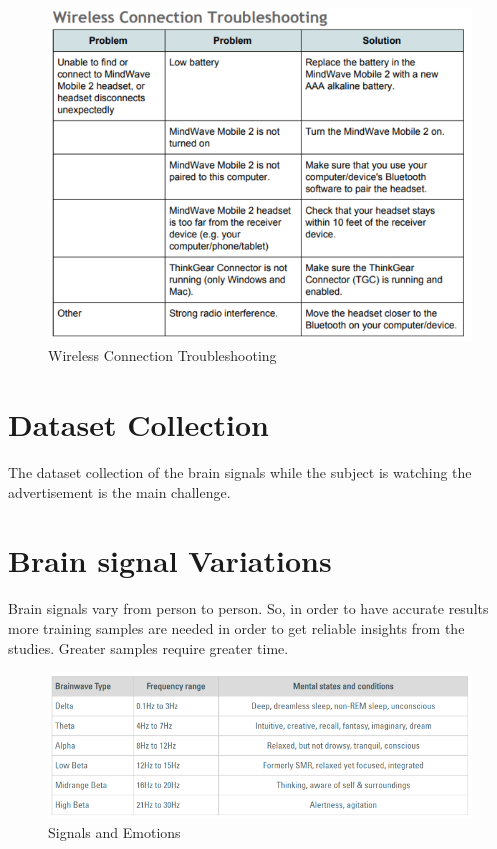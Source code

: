 \documentclass[a4paper, 12pt, oneside]{uet_thesis}
\begin{document}
\begin{figure}[htbp]
\centerline{\includegraphics[scale=0.7]{Table1.png}}
\caption{Wireless Connection Troubleshooting}
\label{Table1}
\end{figure}

\section{Dataset Collection}
The dataset collection of the brain signals while the subject is watching the advertisement is the main challenge.

\section{Brain signal Variations}
Brain signals vary from person to person. So, in order to have accurate results more training samples are needed in order to get reliable insights from the studies. Greater samples require greater time\cite{b32}.

\begin{figure}[htbp]
\centerline{\includegraphics[scale=0.7]{Table2.png}}
\caption{Signals and Emotions}
\label{Table2}
\end{figure}
\end{document}
